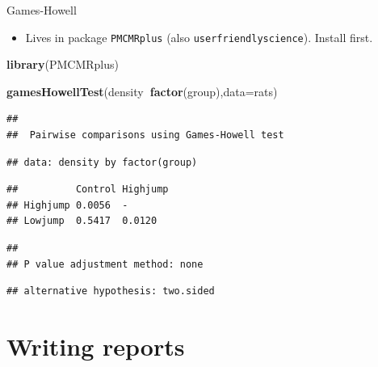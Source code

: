 \documentclass[
  ignorenonframetext,
]{beamer}
\newenvironment{Shaded}{\begin{snugshade}}{\end{snugshade}}
\newcommand{\DataTypeTok}[1]{\textcolor[rgb]{0.13,0.29,0.53}{#1}}
\newcommand{\KeywordTok}[1]{\textcolor[rgb]{0.13,0.29,0.53}{\textbf{#1}}}
\newcommand{\NormalTok}[1]{#1}
\newcommand{\OperatorTok}[1]{\textcolor[rgb]{0.81,0.36,0.00}{\textbf{#1}}}
\providecommand{\tightlist}{%
  \setlength{\itemsep}{0pt}\setlength{\parskip}{0pt}}
\begin{document}
\begin{frame}[fragile]{Games-Howell}
\protect\hypertarget{games-howell}{}

\begin{itemize}
\tightlist
\item
  Lives in package \texttt{PMCMRplus} (also
  \texttt{userfriendlyscience}). Install first.
\end{itemize}

\begin{Shaded}
\begin{Highlighting}[]
\KeywordTok{library}\NormalTok{(PMCMRplus)}
\end{Highlighting}
\end{Shaded}

\begin{Shaded}
\begin{Highlighting}[]
\KeywordTok{gamesHowellTest}\NormalTok{(density}\OperatorTok{~}\KeywordTok{factor}\NormalTok{(group),}\DataTypeTok{data=}\NormalTok{rats)}
\end{Highlighting}
\end{Shaded}

\begin{verbatim}
## 
##  Pairwise comparisons using Games-Howell test
\end{verbatim}

\begin{verbatim}
## data: density by factor(group)
\end{verbatim}

\begin{verbatim}
##          Control Highjump
## Highjump 0.0056  -       
## Lowjump  0.5417  0.0120
\end{verbatim}

\begin{verbatim}
## 
## P value adjustment method: none
\end{verbatim}

\begin{verbatim}
## alternative hypothesis: two.sided
\end{verbatim}

\end{frame}

\hypertarget{writing-reports}{%
\section{Writing reports}\label{writing-reports}}
\end{document}
